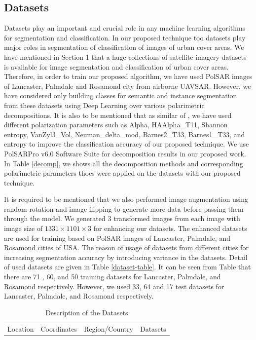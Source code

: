 \documentclass[a4paper,12pt]{spieman}  %
\begin{document}
\begin{spacing}{1}
\section{Datasets}
Datasets play an important and crucial role in any machine learning algorithms for segmentation and classification. In our proposed technique too datasets play major roles in segmentation of classification of images of urban cover areas. We have mentioned in Section 1 that a huge collections of
satellite imagery datasets is available for image segmentation and classification of urban cover areas. Therefore, in order to train our proposed algorithm, we have used PolSAR images of Lancaster, Palmdale and Rosamond city from airborne UAVSAR. However, we have considered only building classes for semantic and instance segmentation from these datasets using Deep Learning over various polarimetric decompositions. It is also to be mentioned that as similar of \citep{rs61212575}, we have used different polarization parameters such as Alpha, HAAlpha\_T11, Shannon entropy, VanZyl3\_Vol, Neuman\_delta\_mod, Barnes2\_T33, Barnes1\_T33, and entropy to improve the classification accuracy of our proposed technique. We use PolSARPro v6.0 Software Suite \cite{pottier2019polsarpro} for decomposition results in our proposed work. In Table \ref{decomp}, we shows all the decomposition methods and corresponding polarimetric parameters thoes were applied on the datasets with our proposed technique.
\par It is required to be mentioned that we also performed image augmentation using random rotation and image flipping to generate more data before passing them through the model. We generated $3$ transformed images from each image with image size of $1331 \times 1101 \times 3$ for enhancing our datasets. The enhanced datasets are used for training based on PolSAR images of Lancaster, Palmdale, and Rosamond cities of USA. The reason of usage of datasets from different cities for increasing segmentation accuracy by introducing variance in the datasets. Detail of used datasets are given in Table \ref{dataset-table}. It can be seen from Table that there are 71 , 60, and 50 training datasets for Lancaster, Palmdale, and Rosamond respectively. However, we used 33, 64 and 17 test datasets for Lancaster, Palmdale, and Rosamond respectively.
\begin{table}[]
\captionsetup{justification=centering, margin=2cm}
\caption{Description of the Datasets}
\begin{tabular}{|c|c|c|c|c|c|}
\hline
\multirow{2}{*}{Location} & \multicolumn{2}{c|}{Coordinates} & \multirow{2}{*}{Region/Country} & \multicolumn{2}{c|}{Datasets} \\ \cline{2-3} \cline{5-6}

\end{tabular}
\end{table}
\end{spacing}
\end{document}
